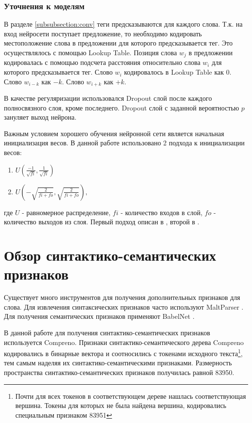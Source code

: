   \subsubsection{Уточнения к моделям}

  В разделе \ref{subsubsection:conv} теги предсказываются для каждого слова.
  Т.к. на вход нейросети поступает предложение, то необходимо кодировать
  местоположение слова в предложении для которого предсказывается тег.
  Это осуществлялось с помощью Lookup Table.
  Позиция слова $w_j$ в предложении кодировалась
  с помощью подсчета расстояния относительно слова $w_i$ для которого предсказывается тег.
  Слово $w_i$ кодировалось в Lookup Table как $0$. Слово $w_{i-k}$ как $-k$. Слово $w_{i+k}$ как $+k$.

  В качестве регуляризации использовался Dropout слой после каждого полносвязного слоя,
  кроме последнего.
  Dropout слой \citep{srivastava2014dropout} с заданной вероятностью $p$ зануляет
  выход нейрона.

  Важным условием хорошего обучения нейронной сети является начальная инициализация
  весов. В данной работе использовано 2 подхода к инициализации весов:
  \begin{enumerate}
  \item $U(\frac{-1}{\sqrt{fi}}, \frac{1}{\sqrt{fi}})$
  \item $U(-\sqrt{\frac{2}{fi + fo}}, \sqrt{\frac{2}{fi + fo}}),$
  \end{enumerate}
  где $U$ - равномерное распределение, $fi$ - количество входов в слой,
  $fo$ - количество выходов из слоя.
  Первый подход описан в \citep{collobert2011natural}, второй в \citep{glorot2010understanding}.


  \section{Обзор синтактико-семантических признаков}
    Существует много инструментов для получения дополнительных признаков для слова.
    Для извлечения синтаксических признаков часто используют MaltParser \citep{nivre2006maltparser}.
    Для получения семантических признаков применяют BabelNet \citep{navigli2010babelnet}.

    В данной работе для получения синтактико-семантических признаков используется Compreno.
    Признаки синтактико-семантического дерева Compreno кодировались в бинарные вектора
    и соотносились с токенами исходного
    текста\footnote{Почти для всех токенов в соответствующем дереве нашлась соответствующая вершина.
    Токены для которых не была найдена вершина, кодировались специальным признаком 83951},
    тем самым наделяя их синтактико-се\-ман\-ти\-ческими признаками.
    Размерность пространства синтактико-се\-ман\-ти\-ческих признаков получилась равной 83950.

